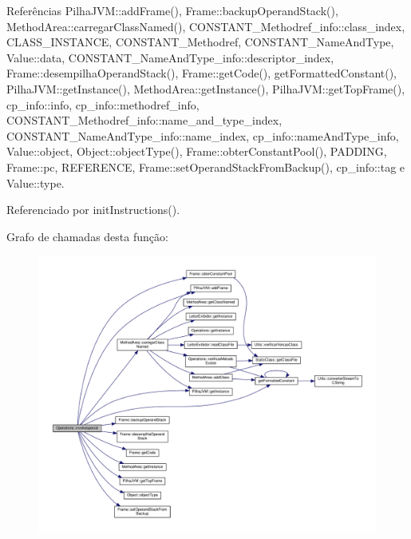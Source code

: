 Referências Pilha\+J\+V\+M\+::add\+Frame(), Frame\+::backup\+Operand\+Stack(), Method\+Area\+::carregar\+Class\+Named(), C\+O\+N\+S\+T\+A\+N\+T\+\_\+\+Methodref\+\_\+info\+::class\+\_\+index, C\+L\+A\+S\+S\+\_\+\+I\+N\+S\+T\+A\+N\+CE, C\+O\+N\+S\+T\+A\+N\+T\+\_\+\+Methodref, C\+O\+N\+S\+T\+A\+N\+T\+\_\+\+Name\+And\+Type, Value\+::data, C\+O\+N\+S\+T\+A\+N\+T\+\_\+\+Name\+And\+Type\+\_\+info\+::descriptor\+\_\+index, Frame\+::desempilha\+Operand\+Stack(), Frame\+::get\+Code(), get\+Formatted\+Constant(), Pilha\+J\+V\+M\+::get\+Instance(), Method\+Area\+::get\+Instance(), Pilha\+J\+V\+M\+::get\+Top\+Frame(), cp\+\_\+info\+::info, cp\+\_\+info\+::methodref\+\_\+info, C\+O\+N\+S\+T\+A\+N\+T\+\_\+\+Methodref\+\_\+info\+::name\+\_\+and\+\_\+type\+\_\+index, C\+O\+N\+S\+T\+A\+N\+T\+\_\+\+Name\+And\+Type\+\_\+info\+::name\+\_\+index, cp\+\_\+info\+::name\+And\+Type\+\_\+info, Value\+::object, Object\+::object\+Type(), Frame\+::obter\+Constant\+Pool(), P\+A\+D\+D\+I\+NG, Frame\+::pc, R\+E\+F\+E\+R\+E\+N\+CE, Frame\+::set\+Operand\+Stack\+From\+Backup(), cp\+\_\+info\+::tag e Value\+::type.



Referenciado por init\+Instructions().

Grafo de chamadas desta função\+:
\nopagebreak
\begin{figure}[H]
\begin{center}
\leavevmode
\includegraphics[width=350pt]{classOperations_ab561e27c8450ceec7e4f8b0a155fcda3_cgraph}
\end{center}
\end{figure}
\mbox{\label{classOperations_a562d8c9cc5975de2ee6d1a95e1969724}} 
